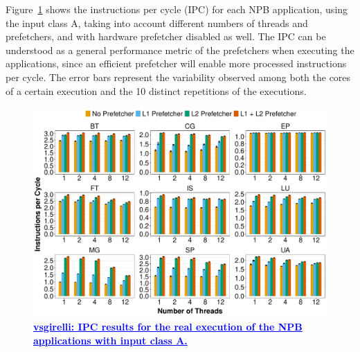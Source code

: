 \documentclass[AMA,final,STIX1COL]{WileyNJD-v2}
\newcommand{\ms}[1]{\textcolor{orange}{\bfseries \ul{ msserpa: #1} }\vspace{0.2cm}}
\newcommand{\vsg}[1]{\textcolor{blue}{\bfseries \ul{vsgirelli: #1} }\vspace{0.2cm}}
\newcommand{\fbm}[1]{\textcolor{red}{\bfseries \ul{fbm: #1} }\vspace{0.2cm}}
\begin{document}





Figure~\ref{fig:ipc} shows the instructions per cycle (IPC) for each NPB application, using the input class A, taking into account different numbers of threads and prefetchers, and with hardware prefetcher disabled as well. 
The IPC can be understood as a general performance metric of the prefetchers when executing the applications, since an efficient prefetcher will enable more processed instructions per cycle. 
The error bars represent the variability observed among both the cores of a certain execution and the 10 distinct repetitions of the executions.

\begin{figure}[b]
    \centering
    \includegraphics[width=\linewidth]{figures/fig2.pdf}
    \caption{\vsg{IPC results for the real execution of the NPB applications with input class A.}}
    \label{fig:ipc}
\end{figure}
\end{document}

